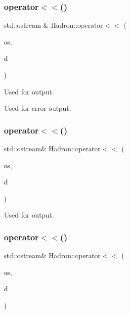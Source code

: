 \subsubsection{\texorpdfstring{operator$<$$<$()}{operator<<()}\hspace{0.1cm}{\footnotesize\ttfamily [7/48]}}
{\footnotesize\ttfamily std\+::ostream \& Hadron\+::operator$<$$<$ (\begin{DoxyParamCaption}\item[{std\+::ostream \&}]{os,  }\item[{const \mbox{\hyperlink{structHadron_1_1KeyHadronSUNNPartIrrep__t}{Key\+Hadron\+S\+U\+N\+N\+Part\+Irrep\+\_\+t}} \&}]{d }\end{DoxyParamCaption})}



Used for output. 

Used for error output. \mbox{\label{namespaceHadron_a1efe31b41d734bffbf3ac7a82e8be6b5}} 
\subsubsection{\texorpdfstring{operator$<$$<$()}{operator<<()}\hspace{0.1cm}{\footnotesize\ttfamily [8/48]}}
{\footnotesize\ttfamily std\+::ostream\& Hadron\+::operator$<$$<$ (\begin{DoxyParamCaption}\item[{std\+::ostream \&}]{os,  }\item[{const \mbox{\hyperlink{structHadron_1_1KeyHadronSUNNPartIrrepOp__t_1_1CGPair__t_1_1Slot__t}{Key\+Hadron\+S\+U\+N\+N\+Part\+Irrep\+Op\+\_\+t\+::\+C\+G\+Pair\+\_\+t\+::\+Slot\+\_\+t}} \&}]{d }\end{DoxyParamCaption})}



Used for output. 

\mbox{\label{namespaceHadron_aa256e22743f6ceb24e2b83988cb4d7bd}} 
\subsubsection{\texorpdfstring{operator$<$$<$()}{operator<<()}\hspace{0.1cm}{\footnotesize\ttfamily [9/48]}}
{\footnotesize\ttfamily std\+::ostream\& Hadron\+::operator$<$$<$ (\begin{DoxyParamCaption}\item[{std\+::ostream \&}]{os,  }\item[{const \mbox{\hyperlink{structHadron_1_1KeyHadronNPartIrrepOp__t_1_1CGPair__t_1_1Slot__t}{Key\+Hadron\+N\+Part\+Irrep\+Op\+\_\+t\+::\+C\+G\+Pair\+\_\+t\+::\+Slot\+\_\+t}} \&}]{d }\end{DoxyParamCaption})}



